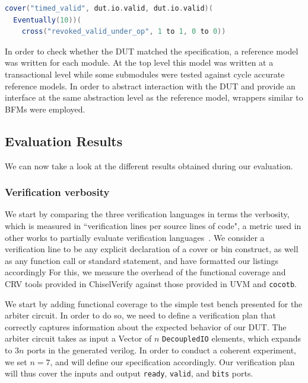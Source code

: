 \documentclass[conference]{IEEEtran}
\begin{document}
\begin{lstlisting}[language=scala, caption={A timed cover construct.}, label={lst:timedcover}]
cover("timed_valid", dut.io.valid, dut.io.valid)(
  Eventually(10))(
    cross("revoked_valid_under_op", 1 to 1, 0 to 0))
\end{lstlisting}

In order to check whether the DUT matched the specification, a reference model was written for each module. 
At the top level this model was written at a transactional level while some submodules were tested against cycle accurate reference models.
In order to abstract interaction with the DUT and provide an interface at the same abstraction level as the reference model, wrappers similar to BFMs were employed. 

\subsection{Evaluation Results}
We can now take a look at the different results obtained during our evaluation.
\subsubsection{Verification verbosity}
We start by comparing the three verification languages in terms the verbosity, which is measured in ``verification lines per source lines of code", a metric used in other works to partially evaluate verification languages~\cite{Nagini:2018, MuellerSchwerhoffSummers16, dobisCoverage:ETS22}.
We consider a verification line to be any explicit declaration of a cover or bin construct, as well as any function call or standard statement, and have formatted our listings accordingly
For this, we measure the overhead of the functional coverage and CRV tools provided in ChiselVerify against those provided in UVM and \texttt{cocotb}.

We start by adding functional coverage to the simple test bench presented for the arbiter circuit. 
In order to do so, we need to define a verification plan that correctly captures information about the expected behavior of our DUT.
The arbiter circuit takes as input a Vector of $n$ \texttt{DecoupledIO} elements, which expands to $3n$ ports in the generated verilog.
In order to conduct a coherent experiment, we set $n = 7$, and will define our specification accordingly.
Our verification plan will thus cover the inputs and output \texttt{ready}, \texttt{valid}, and \texttt{bits} ports.
\end{document}
